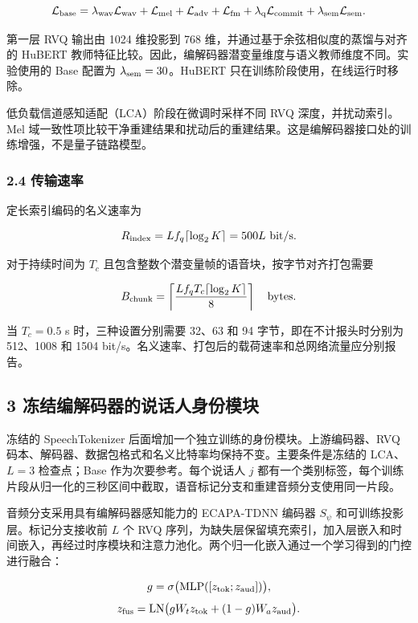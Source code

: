 \documentclass[12pt]{article}
\begin{document}
\[
\mathcal L_{\rm base}=\lambda_{\rm wav}\mathcal L_{\rm wav}
+\mathcal L_{\rm mel}+\mathcal L_{\rm adv}+\mathcal L_{\rm fm}
+\lambda_{\rm q}\mathcal L_{\rm commit}
+\lambda_{\rm sem}\mathcal L_{\rm sem}.
\]

第一层 RVQ 输出由 1024 维投影到 768
维，并通过基于余弦相似度的蒸馏与对齐的 HuBERT
教师特征比较。因此，编解码器潜变量维度与语义教师维度不同。实验使用的
Base 配置为 \(\lambda_{\rm sem}=30\)。HuBERT
只在训练阶段使用，在线运行时移除。

低负载信道感知适配（LCA）阶段在微调时采样不同 RVQ 深度，并扰动索引。Mel
域一致性项比较干净重建结果和扰动后的重建结果。这是编解码器接口处的训练增强，不是量子链路模型。

\subsubsection{2.4 传输速率}\label{ux4f20ux8f93ux901fux7387}

定长索引编码的名义速率为

\[
R_{\rm index}=L f_q\lceil\log_2K\rceil=500L\ {\rm bit/s}.
\]

对于持续时间为 \(T_c\) 且包含整数个潜变量帧的语音块，按字节对齐打包需要

\[
B_{\rm chunk}=\left\lceil
\frac{L f_qT_c\lceil\log_2K\rceil}{8}
\right\rceil\quad\text{bytes}.
\]

当 \(T_c=0.5\) s 时，三种设置分别需要 32、63 和 94
字节，即在不计报头时分别为 512、1008 和 1504
bit/s。名义速率、打包后的载荷速率和总网络流量应分别报告。

\subsection{3
冻结编解码器的说话人身份模块}\label{ux51bbux7ed3ux7f16ux89e3ux7801ux5668ux7684ux8bf4ux8bddux4ebaux8eabux4efdux6a21ux5757}


冻结的 SpeechTokenizer
后面增加一个独立训练的身份模块。上游编码器、RVQ
码本、解码器、数据包格式和名义比特率均保持不变。主要条件是冻结的
LCA、\(L=3\) 检查点；Base 作为次要参考。每个说话人 \(j\)
都有一个类别标签，每个训练片段从归一化的三秒区间中截取，语音标记分支和重建音频分支使用同一片段。

音频分支采用具有编解码器感知能力的 ECAPA-TDNN 编码器 \(S_\psi\)
和可训练投影层。标记分支接收前 \(L\) 个 RVQ
序列，为缺失层保留填充索引，加入层嵌入和时间嵌入，再经过时序模块和注意力池化。两个归一化嵌入通过一个学习得到的门控进行融合：

\[
g=\sigma\bigl({\rm MLP}([z_{\rm tok};z_{\rm aud}])\bigr),
\] \[
z_{\rm fus}={\rm LN}\bigl(gW_tz_{\rm tok}+(1-g)W_az_{\rm aud}\bigr).
\]
\end{document}
